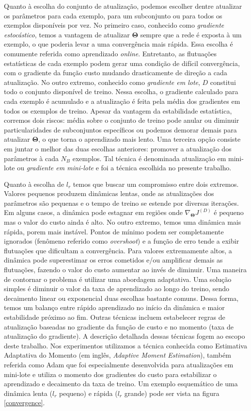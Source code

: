 Quanto à escolha do conjunto de atualização, podemos escolher dentre atualizar os parâmetros para cada exemplo, para um subconjunto ou para todos os exemplos disponíveis por vez. No primeiro caso, conhecido como \textit{gradiente estocástico}, temos a vantagem de atualizar $\mathbf{\Theta}$ sempre que a rede é exposta à um exemplo, o que poderia levar a uma convergência mais rápida. Essa escolha é comumente referida como aprendizado \textit{online}. Entretanto, as flutuações estatísticas de cada exemplo podem gerar uma condição de difícil convergência, com o gradiente da função custo mudando drasticamente de direção a cada atualização. No outro extremo, conhecido como \textit{gradiente em lote}, $D$ constitui todo o conjunto disponível de treino. Nessa escolha, o gradiente calculado para cada exemplo é acumulado e a atualização é feita pela média dos gradientes em todos os exemplos de treino. Apesar da vantagem da estabilidade estatística, corremos dois riscos: média sobre o conjunto de treino pode anular ou diminuir particularidades de subconjuntos específicos ou podemos demorar demais para atualizar $\mathbf{\Theta}$, o que torna o aprendizado mais lento. Uma terceira opção consiste em juntar o melhor das duas escolhas anteriores: promover a atualização dos parâmetros à cada $N_B$ exemplos. Tal técnica é denominada atualização em mini-lote ou \textit{gradiente em mini-lote} e foi a técnica escolhida no presente trabalho.  

Quanto à escolha de $l_r$ temos que buscar um compromisso entre dois extremos. Valores pequenos produzem dinâmicas lentas, onde as atualizações dos parâmetros são pequenas e o tempo de treino se estende por diversas iterações. Em alguns casos, a dinâmica pode estagnar em regiões onde $\nabla_{\mathbf{\Theta}} J^{(D)}$ é pequeno mas o valor do custo ainda é alto. No outro extremo, temos uma dinâmica mais rápida, porem mais instável. Pontos de mínimo podem ser completamente ignorados (fenômeno referido como \textit{overshoot}) e a função de erro tende a exibir flutuações que dificultam a convergência. Para valores extremamente altos, a dinâmica pode superestimar os erros cometidos e/ou amplificar demais as flutuações, fazendo o valor do custo aumentar ao invés de diminuir. Uma maneira de contornar o problema é utilizar uma abordagem adaptativa. Uma solução simples é diminuir o valor da taxa de aprendizado ao longo do treino, sendo decaimento linear ou exponencial duas escolhas bastante comuns. Dessa forma, temos um balanço entre rápido aprendizado no início da dinâmica e maior estabilidade próximo ao fim. Outras técnicas incluem estabelecer regras de atualização baseadas no gradiente da função de custo e no momento (taxa de atualização do gradiente). A descrição detalhada dessas técnicas fogem ao escopo deste trabalho. Nos experimentos utilizamos a técnica conhecida como Estimativa Adaptativa do Momento (em inglês, \textit{Adaptive Moment Estimation}), também referida como Adam \cite{adam_op} que foi especialmente desenvolvida para atualizações em mini-lote e utiliza o momento dos gradientes do custo para estabilizar o aprendizado e decaimento da taxa de treino. Um exemplo esquemático de uma dinâmica lenta ($l_r$ pequeno) e rápida ($l_r$ grande) pode ser vista na figura \ref{convergence}.

